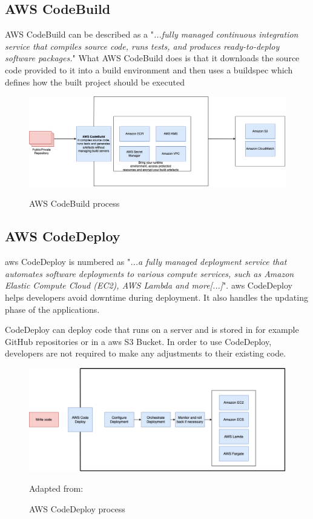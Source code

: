 \subsection{AWS CodeBuild }
AWS CodeBuild can be described as a "\textit{...fully managed continuous integration service that compiles source code, runs tests, and produces ready-to-deploy software packages.}"
\cite{AWSCodeBuild}
What AWS CodeBuild does is that it downloads the source code provided to it into a build environment and then uses a \Gls{buildspec} which defines how the built project should be executed\cite{AWSCodeBuild1}
\begin{figure}[H]
    \centering
    \includegraphics[scale=0.4]{Images/CodeBuild.png}
    \caption{AWS CodeBuild process}\cite{AWSCodeBuild}
    \label{fig: AWS CodeBuild Process}
\end{figure}

\subsection{AWS CodeDeploy}
\acrshort{aws} CodeDeploy is numbered as "\textit{...a fully managed deployment service that automates software deployments to various compute services, such as Amazon Elastic Compute Cloud (EC2), AWS Lambda and more[...]}"\cite{AWSCodeDeploy}.
\acrshort{aws} CodeDeploy helps developers avoid downtime during deployment. It also handles the updating phase of the applications. 

CodeDeploy can deploy code that runs on a server and is stored in for example GitHub repositories or in a \acrshort{aws} S3 Bucket. In order to use CodeDeploy, developers are not required to make any adjustments to their existing code. \cite{CodeDeploy1}

\begin{figure}[H]
    \centering
    \includegraphics[scale=0.4]{Images/AWSCodeDeploy.png}
    \caption{AWS CodeDeploy process} Adapted from: \cite{CodeDeploy1}
    \label{fig:AWS CodeDeploy Process}
\end{figure}


